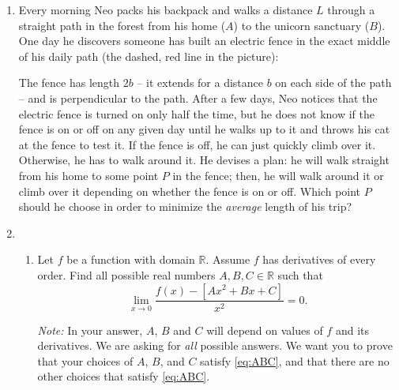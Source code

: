 \documentclass[12pt]{exam}
\newcommand{\vv}{\vspace{.1cm}}
\newcommand{\R}{\mathbb{R}}
\begin{document}
\begin{enumerate}

\item Every morning Neo packs his backpack and walks a distance $L$ through a straight path in the forest from his home ($A$) to the unicorn sanctuary ($B$).  One day he discovers someone has built an electric fence in the exact middle of his daily path (the dashed, red line in the picture):
\begin{center}
\end{center}
The fence has length $2b$ --  it extends for a distance $b$ on each side of the path -- and is perpendicular to the path.  After a few days, Neo notices that the electric fence is turned on only half the time, but he does not know if the fence is on or off on any given day until he walks up to it and throws his cat at the fence to test it.  If the fence is off, he can just quickly climb over it.  Otherwise, he has to walk around it.  He devises a plan: he will walk straight from his home to some point $P$ in the fence; then, he will walk around it or climb over it depending on whether the fence is on or off.    Which point $P$ should he choose in order to minimize the \emph{average} length of his trip?


\vv

\item  
	\begin{enumerate}
				
		\item  Let $f$ be a function with domain $\R$.  Assume $f$ has derivatives of every order.  Find all possible real numbers $A, B, C \in \R$ such that
			\begin{equation} \label{eq:ABC}
				\lim_{x \to 0} \frac{f(x) - \left[ Ax^2 + B x + C \right]}{x^2} = 0.
			\end{equation}	
			
			\emph{Note:} In your answer, $A$, $B$ and $C$ will depend on values of $f$ and its derivatives.  We are asking for \emph{all} possible answers.  We want you to prove that your choices of $A$, $B$, and $C$ satisfy \eqref{eq:ABC}, and that there are no other choices that satisfy \eqref{eq:ABC}.
			

\end{enumerate}
\end{enumerate}
\end{document}
